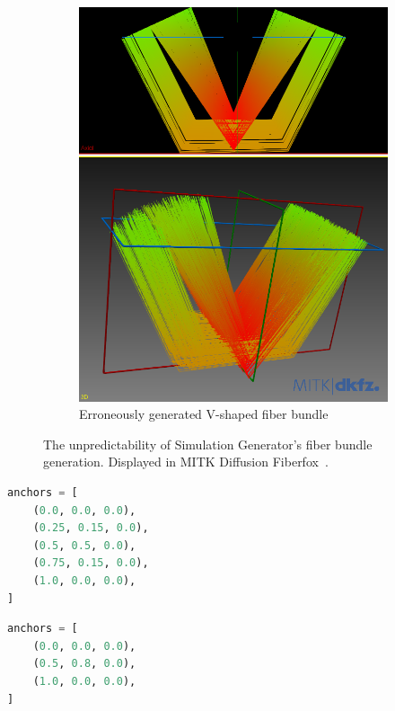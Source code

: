 \documentclass{article}
\begin{document}
\begin{figure}[!htb]
\begin{subfigure}[b]{0.4\textwidth}
      \includegraphics[width=\textwidth]{sim_gen__v_shape__bad}
      \caption{Erroneously generated V-shaped fiber bundle}
      \label{fig:f1-b}
    \end{subfigure}
    \caption{The unpredictability of Simulation Generator's fiber bundle generation. Displayed in MITK Diffusion Fiberfox~\cite{neher2014fiberfox}.}
    \label{fig:f1}
  \end{figure}

  \noindent
  \begin{minipage}[!htb]{.45\textwidth}
    \begin{lstlisting}[language=Python, caption={Centroid anchors used to generate the fiber bundle in Figure~\ref{fig:f1-a}}, label={lst:l1-a}]
anchors = [
    (0.0, 0.0, 0.0),
    (0.25, 0.15, 0.0),
    (0.5, 0.5, 0.0),
    (0.75, 0.15, 0.0),
    (1.0, 0.0, 0.0),
]   \end{lstlisting}
  \end{minipage}
  \hfill
  \begin{minipage}[!htb]{.45\textwidth}
    \begin{lstlisting}[language=Python, caption={Centroid anchors used to generate the fiber bundle in Figure~\ref{fig:f1-b}}, label={lst:l1-b}]
anchors = [
    (0.0, 0.0, 0.0),
    (0.5, 0.8, 0.0),
    (1.0, 0.0, 0.0),
]   \end{lstlisting}
  \end{minipage}
\end{document}

